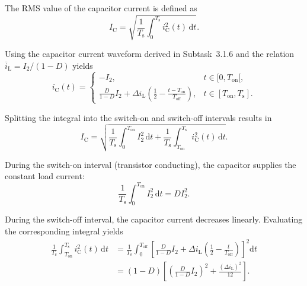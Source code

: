 \begin{solutionblock}
	The RMS value of the capacitor current is defined as
	\begin{equation}
		I_\mathrm{C} =
		\sqrt{\frac{1}{T_\mathrm{s}}
			\int_0^{T_\mathrm{s}} i_\mathrm{C}^2(t)\,\mathrm{d}t}.
	\end{equation}

	Using the capacitor current waveform derived in Subtask~3.1.6
	and the relation $\overline{i}_\mathrm{L}=I_2/(1-D)$ yields
	\begin{equation}
		i_\mathrm{C}(t) =
		\begin{cases}
			-I_2,
			 & t\in[0,T_\mathrm{on}[,            \\[1ex]
			\displaystyle
			\frac{D}{1-D}I_2
			+\Delta i_\mathrm{L}
			\left(\frac{1}{2}
			-\frac{t-T_\mathrm{on}}{T_\mathrm{off}}\right),
			 & t\in[T_\mathrm{on},T_\mathrm{s}].
		\end{cases}
	\end{equation}

	Splitting the integral into the switch-on and switch-off
	intervals results in
	\begin{equation}
		I_\mathrm{C} =
		\sqrt{
			\frac{1}{T_\mathrm{s}}
			\int_0^{T_\mathrm{on}} I_2^2\,\mathrm{d}t
			+
			\frac{1}{T_\mathrm{s}}
			\int_{T_\mathrm{on}}^{T_\mathrm{s}}
			i_\mathrm{C}^2(t)\,\mathrm{d}t
		}.
	\end{equation}

	During the switch-on interval (transistor conducting),
	the capacitor supplies the constant load current:
	\begin{equation}
		\frac{1}{T_\mathrm{s}}
		\int_0^{T_\mathrm{on}} I_2^2\,\mathrm{d}t
		= DI_2^2.
	\end{equation}

	During the switch-off interval, the capacitor current
	decreases linearly. Evaluating the corresponding integral yields
	\begin{equation}
		\begin{split}
			\frac{1}{T_\mathrm{s}}
			\int_{T_\mathrm{on}}^{T_\mathrm{s}}
			i_\mathrm{C}^2(t)\,\mathrm{d}t
			 & =
			\frac{1}{T_\mathrm{s}}
			\int_0^{T_\mathrm{off}}
			\left[
				\frac{D}{1-D}I_2
				+\Delta i_\mathrm{L}
				\left(\frac{1}{2}
				-\frac{t}{T_\mathrm{off}}\right)
				\right]^2
			\mathrm{d}t \\
			 & =
			(1-D)
			\left[
				\left(\frac{D}{1-D}I_2\right)^2
				+\frac{(\Delta i_\mathrm{L})^2}{12}
				\right].
		\end{split}
	\end{equation}


\end{solutionblock}
